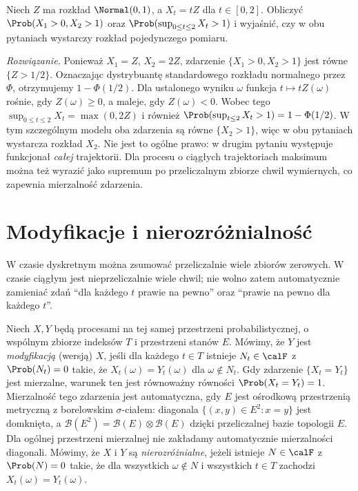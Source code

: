 \begin{zadanie}
Niech $Z$ ma rozkład $\Normal(0,1)$, a $X_t=tZ$ dla
$t\in[0,2]$. Obliczyć $\Prob(X_1>0,X_2>1)$ oraz
$\Prob(\sup_{0\le t\le2}X_t>1)$ i wyjaśnić, czy w obu pytaniach
wystarczy rozkład pojedynczego pomiaru.

\emph{Rozwiązanie.} Ponieważ $X_1=Z$, $X_2=2Z$,
zdarzenie $\{X_1>0,X_2>1\}$ jest równe $\{Z>1/2\}$.
Oznaczając dystrybuantę standardowego rozkładu normalnego przez
$\Phi$, otrzymujemy $1-\Phi(1/2)$.
Dla ustalonego wyniku $\omega$ funkcja $t\mapsto tZ(\omega)$
rośnie, gdy $Z(\omega)\ge0$, a maleje, gdy $Z(\omega)<0$.
Wobec tego $\sup_{0\le t\le2}X_t=\max(0,2Z)$ i również
$\Prob(\sup_{t\le2}X_t>1)=1-\Phi(1/2)$.
W tym szczególnym modelu oba zdarzenia są równe
$\{X_2>1\}$, więc w obu pytaniach wystarcza rozkład $X_2$.
Nie jest to ogólne prawo: w drugim pytaniu występuje
funkcjonał \emph{całej} trajektorii. Dla procesu o ciągłych trajektoriach maksimum można
też wyrazić jako supremum po przeliczalnym zbiorze chwil
wymiernych, co zapewnia mierzalność zdarzenia.
\end{zadanie}

\section{Modyfikacje i nierozróżnialność}
W czasie dyskretnym można zsumować przeliczalnie wiele zbiorów
zerowych. W czasie ciągłym jest nieprzeliczalnie wiele chwil;
nie wolno zatem automatycznie zamieniać zdań ``dla każdego $t$
prawie na pewno'' oraz ``prawie na pewno dla każdego $t$''.

\begin{definicja}
Niech $X,Y$ będą procesami na tej samej przestrzeni probabilistycznej,
o wspólnym zbiorze indeksów $T$ i przestrzeni stanów $E$.
Mówimy, że $Y$ jest \emph{modyfikacją} (wersją) $X$, jeśli
dla każdego $t\in T$ istnieje $N_t\in\calF$ z $\Prob(N_t)=0$
takie, że $X_t(\omega)=Y_t(\omega)$ dla $\omega\notin N_t$.
Gdy zdarzenie $\{X_t=Y_t\}$ jest mierzalne, warunek ten
jest równoważny równości $\Prob(X_t=Y_t)=1$.
Mierzalność tego zdarzenia jest automatyczna, gdy $E$ jest
ośrodkową przestrzenią metryczną z borelowskim $\sigma$-ciałem:
diagonala $\{(x,y)\in E^2:x=y\}$ jest domknięta,
a $\mathcal B(E^2)=\mathcal B(E)\otimes\mathcal B(E)$
dzięki przeliczalnej bazie topologii $E$.
Dla ogólnej przestrzeni mierzalnej nie zakładamy
automatycznie mierzalności diagonali.
Mówimy, że $X$ i $Y$ są \emph{nierozróżnialne}, jeżeli istnieje
$N\in\calF$ z $\Prob(N)=0$ takie, że dla wszystkich
$\omega\notin N$ i wszystkich $t\in T$ zachodzi
$X_t(\omega)=Y_t(\omega)$.
\end{definicja}

